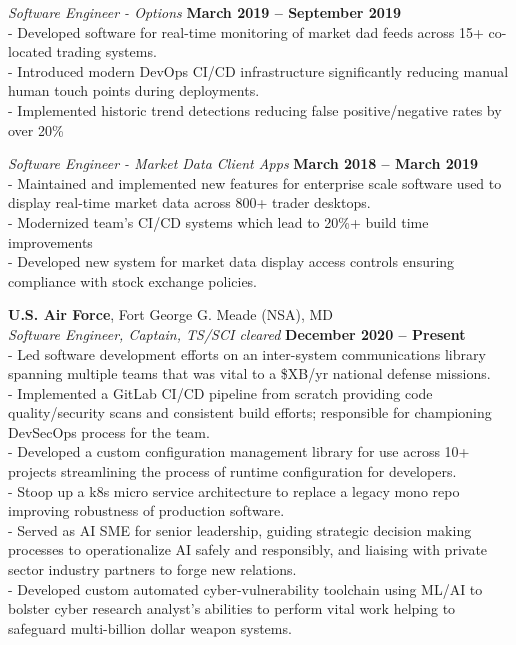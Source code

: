 \documentclass[margin,line]{resume}
\begin{document}
\begin{resume}
    \textsl{Software Engineer - Options} \hfill \textbf{March 2019 -- September 2019}\\
    - Developed software for real-time monitoring of market dad feeds across 15+ co-located trading systems.\vspace{1mm}\\%
    - Introduced modern DevOps CI/CD infrastructure significantly reducing manual human touch points during deployments.\vspace{1mm}\\%
    - Implemented historic trend detections reducing false positive/negative rates by over 20\%

    \textsl{Software Engineer - Market Data Client Apps} \hfill \textbf{March 2018 -- March 2019}\\
    - Maintained and implemented new features for enterprise scale software used to display real-time market data across 800+ trader desktops.\vspace{1mm}\\%
    - Modernized team's CI/CD systems which lead to 20\%+ build time improvements\vspace{1mm}\\%
    - Developed new system for market data display access controls ensuring compliance with stock exchange policies.

    \textbf{U.S. Air Force}, Fort George G. Meade (NSA), MD \vspace{2mm}\\\vspace{1mm}%
    \textsl{Software Engineer, Captain, TS/SCI cleared} \hfill \textbf{December 2020 -- Present}\\
    - Led software development efforts on an inter-system communications library spanning multiple teams that was vital to a \$XB/yr national defense missions.\vspace{1mm}\\%
    - Implemented a GitLab CI/CD pipeline from scratch providing code quality/security scans and consistent build efforts; responsible for championing DevSecOps process for the team.\vspace{1mm}\\%
    - Developed a custom configuration management library for use across 10+ projects streamlining the process of runtime configuration for developers.\vspace{1mm}\\%
    - Stoop up a k8s micro service architecture to replace a legacy mono repo improving robustness of production software.\vspace{1mm}\\%
    - Served as AI SME for senior leadership, guiding strategic decision making processes to operationalize AI safely and responsibly, and liaising with private sector industry partners to forge new relations.\vspace{1mm}\\%
    - Developed custom automated cyber-vulnerability toolchain using ML/AI to bolster cyber research analyst's abilities to perform vital work helping to safeguard multi-billion dollar weapon systems.
 

\end{resume}
\end{document}
